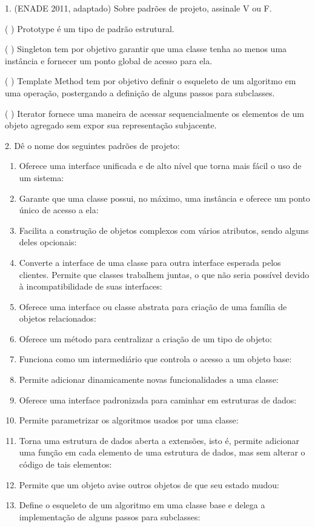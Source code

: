 \documentclass[
  11pt,
  twoside]{book}
\begin{document}
1. (ENADE 2011, adaptado) Sobre padrões de projeto, assinale V ou F.

( ) Prototype é um tipo de padrão estrutural.

( ) Singleton tem por objetivo garantir que uma classe tenha ao menos
uma instância e fornecer um ponto global de acesso para ela.

( ) Template Method tem por objetivo definir o esqueleto de um algoritmo
em uma operação, postergando a definição de alguns passos para
subclasses.

( ) Iterator fornece uma maneira de acessar sequencialmente os elementos
de um objeto agregado sem expor sua representação subjacente.

2. Dê o nome dos seguintes padrões de projeto:

\begin{enumerate}
\def\labelenumi{\alph{enumi})}
\item
  Oferece uma interface unificada e de alto nível que torna mais fácil o
  uso de um sistema:
\item
  Garante que uma classe possui, no máximo, uma instância e oferece um
  ponto único de acesso a ela:
\item
  Facilita a construção de objetos complexos com vários atributos, sendo
  alguns deles opcionais:
\item
  Converte a interface de uma classe para outra interface esperada pelos
  clientes. Permite que classes trabalhem juntas, o que não seria
  possível devido à incompatibilidade de suas interfaces:
\item
  Oferece uma interface ou classe abstrata para criação de uma família
  de objetos relacionados:
\item
  Oferece um método para centralizar a criação de um tipo de objeto:
\item
  Funciona como um intermediário que controla o acesso a um objeto base:
\item
  Permite adicionar dinamicamente novas funcionalidades a uma classe:
\item
  Oferece uma interface padronizada para caminhar em estruturas de
  dados:
\item
  Permite parametrizar os algoritmos usados por uma classe:
\item
  Torna uma estrutura de dados aberta a extensões, isto é, permite
  adicionar uma função em cada elemento de uma estrutura de dados, mas
  sem alterar o código de tais elementos:
\item
  Permite que um objeto avise outros objetos de que seu estado mudou:
\item
  Define o esqueleto de um algoritmo em uma classe base e delega a
  implementação de alguns passos para subclasses:
\end{enumerate}
\end{document}
